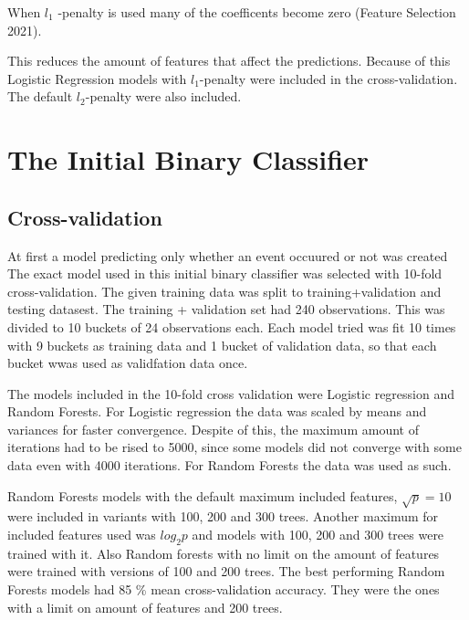 \documentclass[a4size, 12pt]{report}
\begin{document}
		When $l_1$ -penalty is used many of the coefficents become zero (Feature Selection 2021).
		
		 This reduces the amount of features that affect the predictions. Because of this Logistic Regression models with $l_1$-penalty were included in the cross-validation. The default $l_2$-penalty were also included.
	
		
	
	
	
	
	\section*{The Initial Binary Classifier}
	
	\subsection*{Cross-validation}
	
	At first a model predicting only whether an event occuured or not was created The exact model used in this initial binary classifier was selected with 10-fold cross-validation. The given training data was split to training+validation and testing datasest. The training + validation set had 240 observations. This was divided to 10 buckets of 24 observations each. Each model tried was fit 10 times with 9 buckets as training data and 1 bucket of validation data, so that each bucket wwas used as validfation data once.  
	
	The models included in the 10-fold cross validation were Logistic regression and Random Forests. For Logistic regression the data was scaled by means and variances for faster convergence. Despite of this, the maximum amount of iterations had to be rised to 5000, since some models did not converge with some data even with 4000 iterations.  For Random Forests the data was used as such. 
	
		Random Forests models with the default maximum included features, $\sqrt{p}=10$ were included in variants with 100, 200 and 300 trees. Another maximum for included features used was $log_2 p$ and models with 100, 200 and 300 trees were trained with it. Also Random forests with no limit on the amount of features were trained with versions of 100 and 200 trees. The best performing Random Forests models had 85 \% mean cross-validation accuracy. They were the ones with a limit on amount of features and 200 trees.  
	
\end{document}
